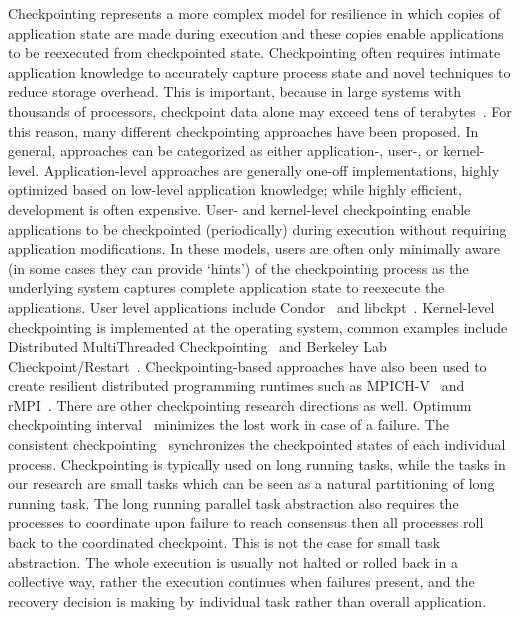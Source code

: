 \documentclass{sig-alternate}
\begin{document}
Checkpointing represents a more complex model for resilience in which copies of application state are made during execution and these copies enable applications to be reexecuted from checkpointed state. Checkpointing often requires intimate application knowledge to accurately capture process state and novel techniques to reduce storage overhead. This is important, because in large systems with thousands of processors, checkpoint data alone may exceed tens of terabytes~\cite{diskless2010}. For this reason, many different checkpointing approaches have been proposed. In general, approaches can be categorized as either application-, user-, or kernel-level. Application-level approaches are generally one-off implementations, highly optimized based on low-level application knowledge; while highly efficient, development is often expensive.
User- and kernel-level checkpointing enable applications to be checkpointed (periodically) during execution without requiring application modifications. In these models, users are often only minimally aware (in some cases they can provide `hints') of the checkpointing process as the underlying system captures complete application state to reexecute the applications. User level applications include Condor~\cite{condor1988} and libckpt~\cite{libckpt1994}. Kernel-level checkpointing is implemented at the operating system, common examples include Distributed MultiThreaded Checkpointing~\cite{dmtcp2009} and Berkeley Lab Checkpoint/Restart~\cite{blcr2006}. Checkpointing-based approaches have also been used to create resilient distributed programming runtimes such as MPICH-V~\cite{bosilca02mpichv} and rMPI~\cite{ferreira2011rmpi}.
There are other checkpointing research directions as well.
Optimum checkpointing interval~\cite{young1974first, daly2006higher} minimizes the lost work in case of a failure.
The consistent checkpointing~\cite{elnozahy1992performance, chandy1985distributed} synchronizes the checkpointed states of each individual process.
Checkpointing is typically used on long running tasks, while the tasks in our research are small tasks which can be seen as a natural partitioning of long running task. The long running parallel task abstraction also requires the processes to coordinate upon failure to reach consensus then all processes roll back to the coordinated checkpoint. This is not the case for small task abstraction. The whole execution is usually not halted or rolled back in a collective way, rather the execution continues when failures present, and the recovery decision is making by individual task rather than overall application.
 
\end{document}
